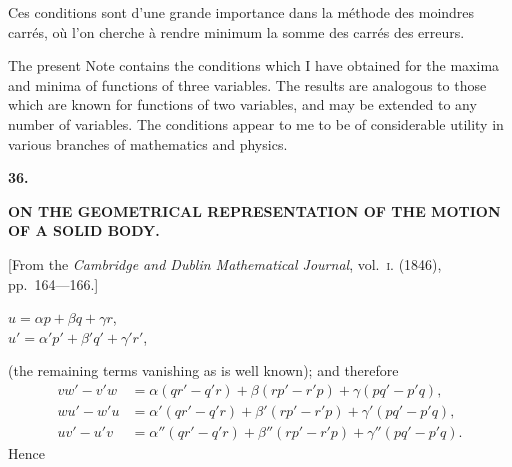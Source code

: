 \documentclass[11pt,a4paper]{book}
\begin{document}
Ces conditions sont d'une grande importance dans la m\'{e}thode des moindres carr\'{e}s,
o\`{u} l'on cherche \`{a} rendre minimum la somme des carr\'{e}s des erreurs.

\newpage
\setcounter{page}{236}

The present Note contains the conditions which I have obtained for the maxima
and minima of functions of three variables. The results are analogous to those which
are known for functions of two variables, and may be extended to any number of
variables. The conditions appear to me to be of considerable utility in various branches
of mathematics and physics.


\newpage
{}
\setcounter{page}{236}

\begin{center}
{\large\bfseries 36.}
\end{center}
\vspace{0.5em}
\begin{center}
{\large\bfseries ON THE GEOMETRICAL REPRESENTATION OF THE MOTION\\[0.3em]
OF A SOLID BODY.}
\end{center}
\vspace{0.5em}
\begin{center}
{[From the \textit{Cambridge and Dublin Mathematical Journal}, vol.~\textsc{i}. (1846),\\
pp.~164---166.]}
\end{center}
\vspace{1em}

\begin{center}
$u = \alpha p + \beta q + \gamma r$,\\[0.3em]
$u' = \alpha' p' + \beta' q' + \gamma' r'$,
\end{center}
(the remaining terms vanishing as is well known); and therefore
\begin{align*}
vw' - v'w &= \alpha(qr' - q'r) + \beta(rp' - r'p) + \gamma(pq' - p'q),\\
wu' - w'u &= \alpha'(qr' - q'r) + \beta'(rp' - r'p) + \gamma'(pq' - p'q),\\
uv' - u'v &= \alpha''(qr' - q'r) + \beta''(rp' - r'p) + \gamma''(pq' - p'q).
\end{align*}
Hence
\end{document}
